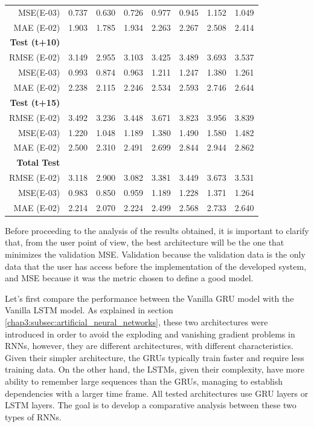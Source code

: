 \begin{table}[htbp]
\begin{tabular}{r|c|cc|cccc}
    MSE(E-03) & 0.737 & 0.630 & 0.726 & 0.977 & 0.945 & 1.152 & 1.049 \\
    MAE (E-02) & 1.903 & 1.785 & 1.934 & 2.263 & 2.267 & 2.508 & 2.414 \\
    \textbf{Test (t+10)} &   &   &   &   &   &   &  \\
    RMSE (E-02) & 3.149 & 2.955 & 3.103 & 3.425 & 3.489 & 3.693 & 3.537 \\
    MSE(E-03) & 0.993 & 0.874 & 0.963 & 1.211 & 1.247 & 1.380 & 1.261 \\
    MAE (E-02) & 2.238 & 2.115 & 2.246 & 2.534 & 2.593 & 2.746 & 2.644 \\
    \textbf{Test (t+15)} &   &   &   &   &   &   &  \\
    RMSE (E-02) & 3.492 & 3.236 & 3.448 & 3.671 & 3.823 & 3.956 & 3.839 \\
    MSE(E-03) & 1.220 & 1.048 & 1.189 & 1.380 & 1.490 & 1.580 & 1.482 \\
    MAE (E-02) & 2.500 & 2.310 & 2.491 & 2.699 & 2.844 & 2.944 & 2.862 \\
    \midrule
    \textbf{Total Test} &   &   &   &   &   &   &  \\
    RMSE (E-02) & 3.118 & 2.900 & 3.082 & 3.381 & 3.449 & 3.673 & 3.531 \\
    MSE(E-03) & 0.983 & 0.850 & 0.959 & 1.189 & 1.228 & 1.371 & 1.264 \\
    MAE (E-02) & 2.214 & 2.070 & 2.224 & 2.499 & 2.568 & 2.733 & 2.640 \\
    \end{tabular}%
  \label{valres}%
\end{table}%


Before proceeding to the analysis of the results obtained, it is important to clarify that, from the user point of view, the best architecture will be the one that minimizes the validation \ac{MSE}. Validation because the validation data is the only data that the user has access before the implementation of the developed system, and \ac{MSE} because it was the metric chosen to define a good model.

Let's first compare the performance between the Vanilla \ac{GRU} model with the Vanilla \ac{LSTM} model. As explained in section \ref{chap3:subsec:artificial_neural_networks}, these two architectures were introduced in order to avoid the exploding and vanishing gradient problems in \ac{RNN}s, however, they are different architectures, with different characteristics. Given their simpler architecture, the \ac{GRU}s typically train faster and require less training data. On the other hand, the \ac{LSTM}s, given their complexity, have more ability to remember large sequences than the \ac{GRU}s, managing to establish dependencies with a larger time frame. All tested architectures use \ac{GRU} layers or \ac{LSTM} layers. The goal is to develop a comparative analysis between these two types of \ac{RNN}s.

